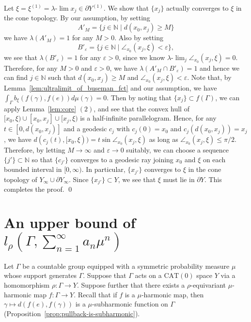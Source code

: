 \documentclass[12pt]{amsart}
\numberwithin{equation}{section}
\theoremstyle{plain}
\theoremstyle{definition}
\theoremstyle{remark}
\newcommand{\N}{{\mathbb N}}
\newcommand{\cat}[1]{\mathrm{CAT}(#1)}
\newcommand{\ulim}{\lambda{\text{-}}\!\lim}
\newcommand{\xxi}[1]{\xi^{(#1)}}
\newcommand{\ray}[1]{[#1)}
\begin{document}
 Let $\xi=\xxi{1} = \ulim x_j \in \partial Y^{(1)}$. 
 We show that $\{x_j\}$ actually converges to $\xi$ in the cone
 topology. 
 By our assumption, by setting 
\begin{equation*}
 A'_M=\{j \in \N \mid d(x_0,x_j)\geq M\}
\end{equation*}
we have $\lambda(A'_M)=1$ for any $M>0$. 
Also by setting 
\begin{equation*}
 B'_{\varepsilon}=\{j \in \N \mid
\angle_{x_0}(x_j,\xi)<\varepsilon\}, 
\end{equation*}
we see that 
$\lambda(B'_{\varepsilon})=1$ for any $\varepsilon>0$, 
since we know $\ulim_j\angle_{x_0}(x_j,\xi)= 0$. 
Therefore, for any $M>0$ and $\varepsilon >0$, 
we have $\lambda (A'_M \cap B'_{\varepsilon})=1$ and hence 
we can find $j \in \N$ such that 
$d(x_0,x_j)\geq M$ and
$\angle_{x_0}(x_j,\xi)< \varepsilon$. 
Note that, by Lemma~\ref{lem:ultralimit_of_buseman_fct} and our assumption, 
we have $\int_{\Gamma}b_{\xi}(f(\gamma),f(e)) d\mu(\gamma)=0$. 
Then by noting that $\{x_j\}\subset f(\Gamma)$, 
we can apply Lemma~\ref{lem:core} $(2)$,
and see that the convex hull of 
$\ray{x_0,\xi} \cup [x_0,x_j]\cup \ray{x_j,\xi}$
is a half-infinite parallelogram.  
Hence, for any $t \in [0,d(x_0,x_j)]$ and a geodesic $c_j$ with
$c_j(0)=x_0$ and $c_j(d(x_0,x_j))=x_j$, we have
$d(c_j(t), \ray{x_0,\xi}) = t\sin \angle_{x_0}(x_j,\xi)$ 
as long as $\angle_{x_0}(x_j,\xi) \leq \pi/2$. 
Therefore, by letting $M\to \infty$ and $\varepsilon \to 0$ suitably, 
we can choose a sequence $\{j'\}\subset \N$ so that $\{c_{j'}\}$
 converges to a geodesic ray joining $x_0$ and $\xi$ on each
 bounded interval in $\ray{0,\infty}$. 
In particular, $\{x_{j'}\}$ converges to $\xi$ in the 
cone topology of $Y_{\infty} \cup \partial Y_{\infty}$. 
Since $\{x_{j'}\}\subset Y$, we see that $\xi$ must lie in
$\partial Y$. This completes the proof. 
\qed


\section{An upper bound of 
$l_{\rho}(\Gamma, \sum_{n=1}^{\infty}a_n\mu^n)$}
\label{sec:appendix}

Let $\Gamma$ be a countable group equipped with a
symmetric probability measure $\mu$ whose support generates $\Gamma$. 
Suppose that $\Gamma$ acts on a $\cat{0}$ space $Y$ via a homomorphism
$\rho\colon \Gamma \rightarrow Y$. 
Suppose further that there exists a $\rho$-equivariant $\mu$-harmonic
map $f\colon \Gamma \rightarrow Y$. 
Recall that if $f$ is a $\mu$-harmonic map, then 
$\gamma \mapsto d(f(e),f(\gamma))$ is a $\mu$-subharmonic function
on $\Gamma$ (Proposition~\ref{prop:pullback-is-subharmonic}). 
\end{document}
